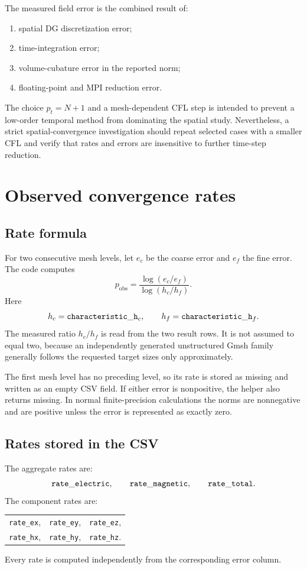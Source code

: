 \documentclass[11pt]{article}
\newcommand{\code}[1]{\nolinkurl{#1}}
\newcommand{\mcode}[1]{\mathtt{\detokenize{#1}}}
\begin{document}
The measured field error is the combined result of:
\begin{enumerate}[leftmargin=*]
  \item spatial DG discretization error;
  \item time-integration error;
  \item volume-cubature error in the reported norm;
  \item floating-point and MPI reduction error.
\end{enumerate}
The choice \(p_t=N+1\) and a mesh-dependent CFL step is intended to prevent a
low-order temporal method from dominating the spatial study. Nevertheless,
a strict spatial-convergence investigation should repeat selected cases with
a smaller CFL and verify that rates and errors are insensitive to further
time-step reduction.

\section{Observed convergence rates}

\subsection{Rate formula}

For two consecutive mesh levels, let \(e_c\) be the coarse error and \(e_f\)
the fine error. The code computes
\[
  p_{\mathrm{obs}}
  =
  \frac{
    \log(e_c/e_f)
  }{
    \log(h_c/h_f)
  }.
\]
Here
\[
  h_c=\mcode{characteristic_h}_{c},
  \qquad
  h_f=\mcode{characteristic_h}_{f}.
\]
The measured ratio \(h_c/h_f\) is read from the two result rows. It is not
assumed to equal two, because an independently generated unstructured Gmsh
family generally follows the requested target sizes only approximately.

The first mesh level has no preceding level, so its rate is stored as missing
and written as an empty CSV field. If either error is nonpositive, the helper
also returns missing. In normal finite-precision calculations the norms are
nonnegative and are positive unless the error is represented as exactly zero.

\subsection{Rates stored in the CSV}

The aggregate rates are:
\[
  \mcode{rate_electric},\qquad
  \mcode{rate_magnetic},\qquad
  \mcode{rate_total}.
\]
The component rates are:
\begin{center}
\begin{tabular}{lll}
  \code{rate_ex},&
  \code{rate_ey},&
  \code{rate_ez},\\
  \code{rate_hx},&
  \code{rate_hy},&
  \code{rate_hz}.
\end{tabular}
\end{center}
Every rate is computed independently from the corresponding error column.
\end{document}
